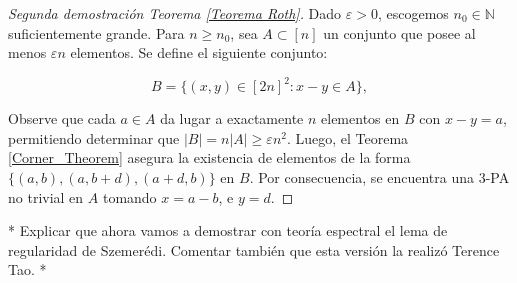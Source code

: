 \documentclass{article}[14pts]
\newcommand{\fs}[1]{{\color{blue}* #1 *}}
\let\varepsilon=\varepsilon
\begin{document}
\begin{proof}[Segunda demostración Teorema \ref{Teorema Roth}]
    Dado $\varepsilon > 0$, escogemos $n_0\in\mathbb{N}$ suficientemente grande. Para $n\geq n_0$, sea $A\subset [n]$ un conjunto que posee al menos $\varepsilon n$ elementos. Se define el siguiente conjunto:\medskip
    
    \[
        B = \lbrace (x,y)\in [2n]^{2} : x-y\in A\rbrace,
    \]\medskip
    
    Observe que cada $a\in A$ da lugar a exactamente $n$ elementos en $B$ con $x-y=a$, permitiendo determinar que $|B| = n|A| \geq \varepsilon n^{2}$. Luego, el Teorema \ref{Corner_Theorem} asegura la existencia de elementos de la forma $\lbrace (a,b), (a, b+d), (a+d,b)\rbrace$ en $B$. Por consecuencia, se encuentra una 3-PA no trivial en $A$ tomando $x = a-b$, e $y = d$.
\end{proof}\medskip

\fs{Explicar que ahora vamos a demostrar con teoría espectral el lema de regularidad de Szemerédi. Comentar también que esta versión la realizó Terence Tao.}\medskip
\end{document}
